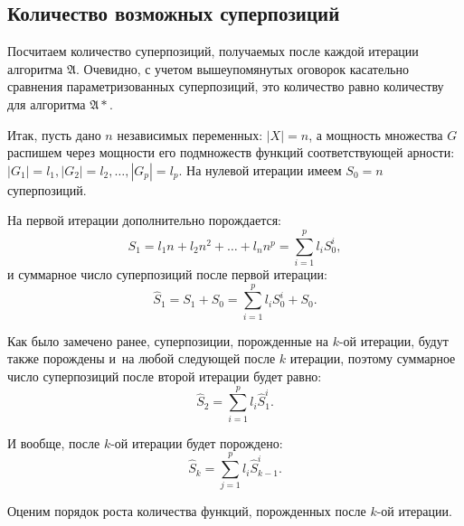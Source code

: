 \documentclass[12pt,a4paper]{amsart}
\begin{document}
\subsection{Количество возможных суперпозиций}

Посчитаем количество суперпозиций, получаемых после каждой итерации алгоритма
$\mathfrak{A}$. Очевидно, с учетом вышеупомянутых оговорок касательно сравнения
параметризованных суперпозиций, это количество равно количеству для алгоритма
$\mathfrak{A*}$.

Итак, пусть дано $n$ независимых переменных: $| X | = n$, а мощность
множества $G$ распишем через мощности его подмножеств функций соответствующей
арности: $| G_1 | = l_1, | G_2 | = l_2, \dots, | G_p | = l_p$. На нулевой
итерации имеем $S_0 = n$ суперпозиций.

На первой итерации дополнительно порождается:
\[
S_1 = l_1 n + l_2 n^2 + \dots + l_n n^p = \sum_{i=1}^p l_i S_0^i,
\]
и суммарное число суперпозиций после первой итерации:
\[
\hat{S}_1 = S_1 + S_0 = \sum_{i=1}^p l_i S_0^i + S_0.
\]

Как было замечено ранее, суперпозиции, порожденные на $k$-ой итерации, будут
также порождены и~на любой следующей после $k$ итерации, поэтому суммарное
число суперпозиций после второй итерации будет равно:
\[
\hat{S}_2 = \sum_{i=1}^p l_i \hat{S}_1^i.
\]

И вообще, после $k$-ой итерации будет порождено:
\[
\hat{S}_k = \sum_{j=1}^p l_i \hat{S}_{k-1}^i.
\]

Оценим порядок роста количества функций, порожденных после $k$-ой итерации.
\end{document}
